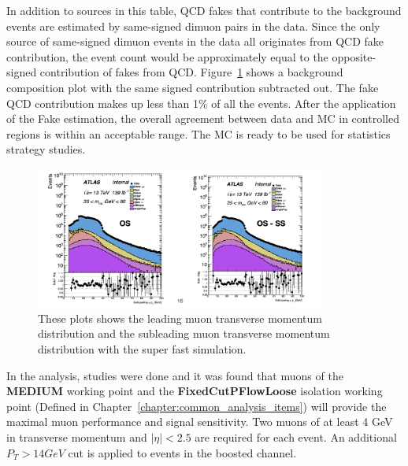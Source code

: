 In addition to sources in this table, QCD fakes that contribute to the background events are estimated by same-signed dimuon pairs in the data. Since the only source of same-signed dimuon events in the data all originates from QCD fake contribution, the event count would be approximately equal to the opposite-signed contribution of fakes from QCD. Figure~\ref{fig:samesigned} shows a background composition plot with the same signed contribution subtracted out. The fake QCD contribution makes up less
than 1\% of all the events. After the application of the Fake estimation, the overall agreement between data and MC in controlled regions is within an acceptable range. The MC is ready to be used for statistics strategy studies.

\begin{figure}[!htb]
    \begin{center}
        \includegraphics[width=0.85\textwidth]{figures/chapter_dimuon/samesigned}
        \caption{
        These plots shows the leading muon transverse momentum distribution and the subleading muon transverse momentum distribution with the super fast simulation.  
        }
        \label{fig:samesigned}
    \end{center}
\end{figure}
\FloatBarrier

In the analysis, studies were done and it was found that muons of the \textbf{MEDIUM} working point and the \textbf{FixedCutPFlowLoose} isolation working point (Defined in Chapter~\ref{chapter:common_analysis_items}) will provide the maximal muon performance and signal sensitivity. Two muons of at least 4 GeV in transverse momentum and $|\eta|<2.5$ are required for each event. An additional $P_{T}> 14GeV$ cut is applied to events in the boosted channel.


